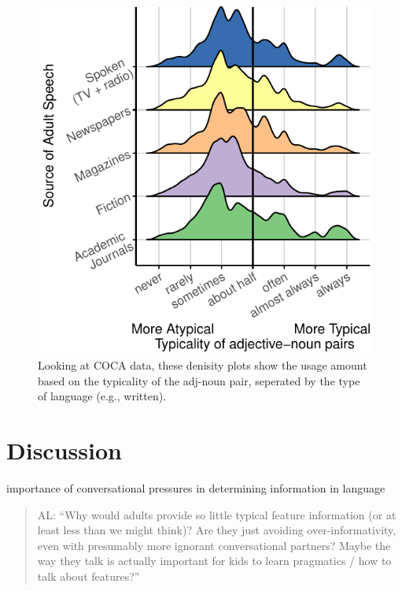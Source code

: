 \documentclass[10pt, letterpaper]{article}
\newenvironment{CodeChunk}{}{}
\begin{document}
\begin{CodeChunk}
\begin{figure}[tb]

\includegraphics{figs/adult_directed-1} \hfill{}

\caption[Looking at COCA data, these denisity plots show the usage amount based on the typicality of the adj-noun pair, seperated by the type of language (e.g., written)]{Looking at COCA data, these denisity plots show the usage amount based on the typicality of the adj-noun pair, seperated by the type of language (e.g., written).}\label{fig:adult_directed}
\end{figure}
\end{CodeChunk}

\hypertarget{discussion}{%
\section{Discussion}\label{discussion}}

importance of conversational pressures in determining information in
language

\begin{quote}
AL: ``Why would adults provide so little typical feature information (or
at least less than we might think)? Are they just avoiding
over-informativity, even with presumably more ignorant conversational
partners? Maybe the way they talk is actually important for kids to
learn pragmatics / how to talk about features?''
\end{quote}
\end{document}
